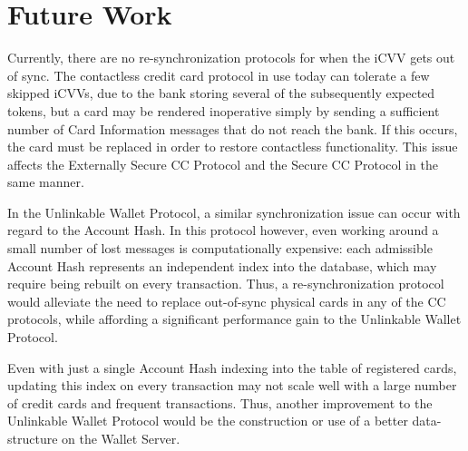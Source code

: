 \section{Future Work}

Currently, there are no re-synchronization protocols for when the iCVV gets out of sync.
The contactless credit card protocol in use today can tolerate a few skipped iCVVs, due to the bank storing several of the subsequently expected tokens,
    but a card may be rendered inoperative simply by sending a sufficient number of Card Information messages that do not reach the bank.
If this occurs, the card must be replaced in order to restore contactless functionality.
This issue affects the Externally Secure CC Protocol and the Secure CC Protocol in the same manner.

In the Unlinkable Wallet Protocol, a similar synchronization issue can occur with regard to the Account Hash.
In this protocol however, even working around a small number of lost messages is computationally expensive:
    each admissible Account Hash represents an independent index into the database, which may require being rebuilt on every transaction.
Thus, a re-synchronization protocol would alleviate the need to replace out-of-sync physical cards in any of the CC protocols,
    while affording a significant performance gain to the Unlinkable Wallet Protocol.

Even with just a single Account Hash indexing into the table of registered cards,
    updating this index on every transaction may not scale well with a large number of credit cards and frequent transactions.
Thus, another improvement to the Unlinkable Wallet Protocol would be the construction or use of a better data-structure on the Wallet Server.